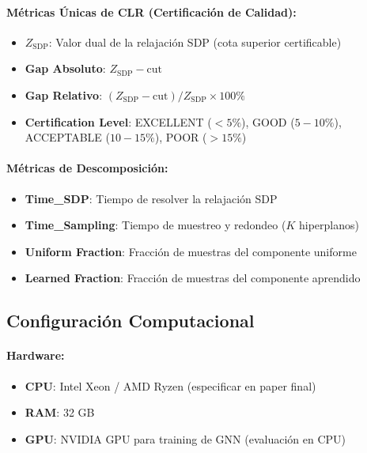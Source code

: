 \documentclass{article}
\begin{document}
\paragraph{Métricas Únicas de CLR (Certificación de Calidad):}
\begin{itemize}
    \item \textbf{$Z_{\text{SDP}}$}: Valor dual de la relajación SDP (cota superior certificable)
    \item \textbf{Gap Absoluto}: $Z_{\text{SDP}} - \text{cut}$
    \item \textbf{Gap Relativo}: $(Z_{\text{SDP}} - \text{cut})/Z_{\text{SDP}} \times 100\%$
    \item \textbf{Certification Level}: EXCELLENT ($<5\%$), GOOD ($5-10\%$), ACCEPTABLE ($10-15\%$), POOR ($>15\%$)
\end{itemize}

\paragraph{Métricas de Descomposición:}
\begin{itemize}
    \item \textbf{Time\_SDP}: Tiempo de resolver la relajación SDP
    \item \textbf{Time\_Sampling}: Tiempo de muestreo y redondeo ($K$ hiperplanos)
    \item \textbf{Uniform Fraction}: Fracción de muestras del componente uniforme
    \item \textbf{Learned Fraction}: Fracción de muestras del componente aprendido
\end{itemize}

\subsection{Configuración Computacional}

\paragraph{Hardware:}
\begin{itemize}
    \item \textbf{CPU}: Intel Xeon / AMD Ryzen (especificar en paper final)
    \item \textbf{RAM}: 32 GB
    \item \textbf{GPU}: NVIDIA GPU para training de GNN (evaluación en CPU)
\end{itemize}
\end{document}
